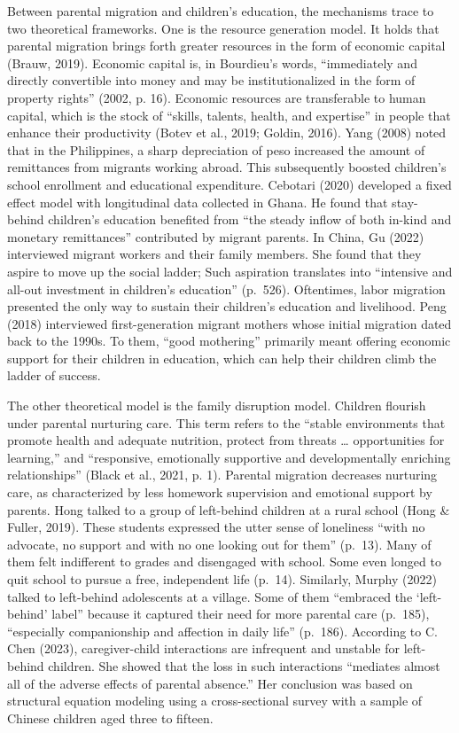 \documentclass[
  man,floatsintext]{apa7}
\begin{document}
Between parental migration and children's education, the mechanisms trace to two theoretical frameworks. One is the resource generation model. It holds that parental migration brings forth greater resources in the form of economic capital (Brauw, 2019). Economic capital is, in Bourdieu's words, ``immediately and directly convertible into money and may be institutionalized in the form of property rights'' (2002, p. 16). Economic resources are transferable to human capital, which is the stock of ``skills, talents, health, and expertise'' in people that enhance their productivity (Botev et al., 2019; Goldin, 2016). Yang (2008) noted that in the Philippines, a sharp depreciation of peso increased the amount of remittances from migrants working abroad. This subsequently boosted children's school enrollment and educational expenditure. Cebotari (2020) developed a fixed effect model with longitudinal data collected in Ghana. He found that stay-behind children's education benefited from ``the steady inflow of both in-kind and monetary remittances'' contributed by migrant parents. In China, Gu (2022) interviewed migrant workers and their family members. She found that they aspire to move up the social ladder; Such aspiration translates into ``intensive and all-out investment in children's education'' (p.~526). Oftentimes, labor migration presented the only way to sustain their children's education and livelihood. Peng (2018) interviewed first-generation migrant mothers whose initial migration dated back to the 1990s. To them, ``good mothering'' primarily meant offering economic support for their children in education, which can help their children climb the ladder of success.

The other theoretical model is the family disruption model. Children flourish under parental nurturing care. This term refers to the ``stable environments that promote health and adequate nutrition, protect from threats \ldots{} opportunities for learning,'' and ``responsive, emotionally supportive and developmentally enriching relationships'' (Black et al., 2021, p. 1). Parental migration decreases nurturing care, as characterized by less homework supervision and emotional support by parents. Hong talked to a group of left-behind children at a rural school (Hong \& Fuller, 2019). These students expressed the utter sense of loneliness ``with no advocate, no support and with no one looking out for them'' (p.~13). Many of them felt indifferent to grades and disengaged with school. Some even longed to quit school to pursue a free, independent life (p.~14). Similarly, Murphy (2022) talked to left-behind adolescents at a village. Some of them ``embraced the `left-behind' label'' because it captured their need for more parental care (p.~185), ``especially companionship and affection in daily life'' (p.~186). According to C. Chen (2023), caregiver-child interactions are infrequent and unstable for left-behind children. She showed that the loss in such interactions ``mediates almost all of the adverse effects of parental absence.'' Her conclusion was based on structural equation modeling using a cross-sectional survey with a sample of Chinese children aged three to fifteen.
\end{document}
